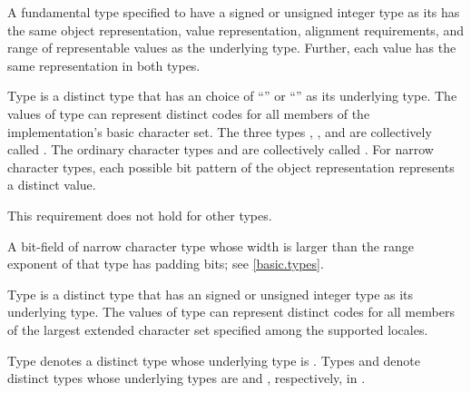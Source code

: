 \pnum
{}%
A fundamental type specified to have
a signed or unsigned integer type as its  has
the same object representation,
value representation,
alignment requirements, and
range of representable values as the underlying type.
Further, each value has the same representation in both types.

\pnum
{}%
%
%
%
%
%
%
%
Type  is a distinct type
that has an  choice of
``'' or ``'' as its underlying type.
The values of type  can represent distinct codes
for all members of the implementation's basic character set.
The three types , , and 
are collectively called
.
The ordinary character types and 
are collectively called .
For narrow character types,
each possible bit pattern of the object representation represents
a distinct value.
\begin{note}
This requirement does not hold for other types.
\end{note}
\begin{note}
A bit-field of narrow character type whose width is larger than
the range exponent of that type has padding bits; see \ref{basic.types}.
\end{note}

\pnum
{}%
%
%
Type  is a distinct type that has
an 
signed or unsigned integer type as its underlying type.
The values of type  can represent
distinct codes for all members of the largest extended character set
specified among the supported locales.

\pnum
{}%
%
%
Type  denotes a distinct type
whose underlying type is .
%
%
%
%
%
%
Types  and  denote distinct types
whose underlying types are  and ,
respectively, in .

